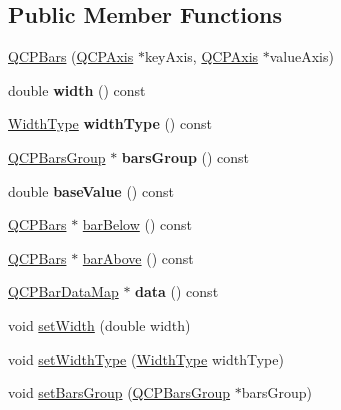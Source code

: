 \subsection*{Public Member Functions}
\begin{DoxyCompactItemize}
\item 
\hyperlink{class_q_c_p_bars_a64006999ad9dff308f40df41cef176ad}{Q\+C\+P\+Bars} (\hyperlink{class_q_c_p_axis}{Q\+C\+P\+Axis} $\ast$key\+Axis, \hyperlink{class_q_c_p_axis}{Q\+C\+P\+Axis} $\ast$value\+Axis)
\item 
\mbox{\label{class_q_c_p_bars_abe7eb3987d8711f45829db879aee2280}} 
double {\bfseries width} () const
\item 
\mbox{\label{class_q_c_p_bars_a4c103fb405a45f47853e0345f0c6e708}} 
\hyperlink{class_q_c_p_bars_a65dbbf1ab41cbe993d71521096ed4649}{Width\+Type} {\bfseries width\+Type} () const
\item 
\mbox{\label{class_q_c_p_bars_a5eef59840b68d205df4e0c3df5f97633}} 
\hyperlink{class_q_c_p_bars_group}{Q\+C\+P\+Bars\+Group} $\ast$ {\bfseries bars\+Group} () const
\item 
\mbox{\label{class_q_c_p_bars_a29a7b3b86f80b2a04bd1f9ec0ebaf422}} 
double {\bfseries base\+Value} () const
\item 
\hyperlink{class_q_c_p_bars}{Q\+C\+P\+Bars} $\ast$ \hyperlink{class_q_c_p_bars_a1b58664864b141f45e02044a855b3213}{bar\+Below} () const
\item 
\hyperlink{class_q_c_p_bars}{Q\+C\+P\+Bars} $\ast$ \hyperlink{class_q_c_p_bars_ab97f2acd9f6cb40d2cc3c33d278f0e78}{bar\+Above} () const
\item 
\mbox{\label{class_q_c_p_bars_a185bcee5f2d96fbc336a2d270687d016}} 
\hyperlink{qcustomplot_8h_aa846c77472cae93def9f1609d0c57191}{Q\+C\+P\+Bar\+Data\+Map} $\ast$ {\bfseries data} () const
\item 
void \hyperlink{class_q_c_p_bars_afec6116579d44d5b706e0fa5e5332507}{set\+Width} (double width)
\item 
void \hyperlink{class_q_c_p_bars_adcaa3b41281bb2c0f7949b341592fcc0}{set\+Width\+Type} (\hyperlink{class_q_c_p_bars_a65dbbf1ab41cbe993d71521096ed4649}{Width\+Type} width\+Type)
\item 
void \hyperlink{class_q_c_p_bars_aedd1709061f0b307c47ddb45e172ef9a}{set\+Bars\+Group} (\hyperlink{class_q_c_p_bars_group}{Q\+C\+P\+Bars\+Group} $\ast$bars\+Group)

\end{DoxyCompactItemize}
